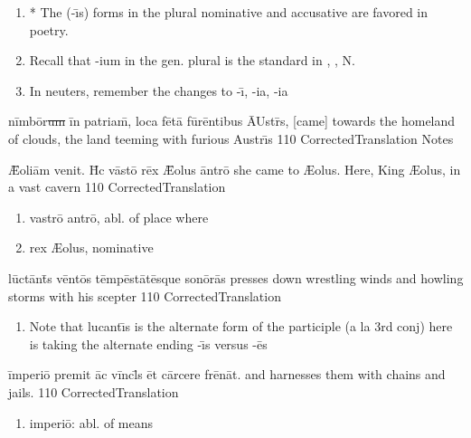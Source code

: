 \documentclass[]{book}
\begin{document}
{	\vskip 2mm	
	
	\begin{enumerate}
		\item * The (-\={\i}s) forms in the plural nominative and accusative are favored in poetry.
		\item Recall that -ium in the gen. plural is the standard in \male, \female, N.
		\item  In neuters, remember the changes to -\={\i}, -ia, -ia
	\end{enumerate}
	 
}

\newpage

\latline
  {n\=imb\={\macron o}r\sout{um }\=in p\-atr\-ia\=m, l\-oc\-a f\={\macron e}t\=a f\=ur\=ent\-ib\-us \={AU}str\={\macron {\i}}s,}
  { [came] towards the homeland of clouds, the land teeming with furious Austr\={\i}s }
  {110}
  { CorrectedTranslation }
  { Notes }



\latline
  {\={\AE}\-ol\-i\=am v\-en\-it.  H\={\macron {\i}}c v\=ast\={\macron o} r\={\macron e}x \={\AE}\-ol\-us \=antr\={\macron o}}
  { she came to {\AE}olus.  Here, King {\AE}olus, in a vast cavern }
  {110}
  { CorrectedTranslation }
  { \begin{enumerate}
  	\item vastr\={o} antr\={o}, abl. of place where
  	\item rex {\AE}olus, nominative
  \end{enumerate} }

\newpage

\latline
  {l\=uct\=ant\={\macron {\i}}s v\=ent\={\macron o}s t\=emp\=est\={\macron a}t\={\macron e}squ\-e s\-on\={\macron o}r\={\macron a}s
}
  { presses down wrestling winds and howling storms with his scepter}
  {110}
  { CorrectedTranslation }
  { \begin{enumerate}
  	\item Note that lucant\={\i}s is the alternate form of the participle (a la 3rd conj) here is taking the alternate ending -\={\i}s versus -\={e}s
  \end{enumerate} }


\latline
  {\=imp\-er\-i\={\macron o} pr\-em\-it \=ac v\=incl\={\macron {\i}}s \=et c\=arc\-er\-e fr\={\macron e}n\=at.
}
  { and harnesses them with chains and jails. }
  {110}
  { CorrectedTranslation }
  { \begin{enumerate}
  	\item imperi\={o}:  abl. of means
  \end{enumerate} }
\end{document}
